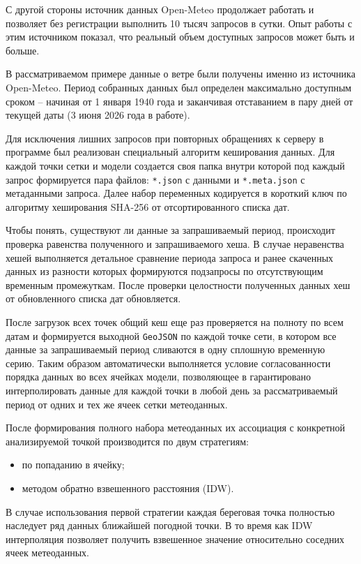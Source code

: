 С другой стороны источник данных Open-Meteo продолжает работать и позволяет без регистрации выполнить 10 тысяч запросов в сутки.
Опыт работы с этим источником показал, что реальный объем доступных запросов может быть и больше.

В рассматриваемом примере данные о ветре были получены именно из источника Open-Meteo.
Период собранных данных был определен максимально доступным сроком -- начиная от 1 января 1940 года и заканчивая отставанием в пару дней от текущей даты (3 июня 2026 года в работе).

Для исключения лишних запросов при повторных обращениях к серверу в программе был реализован специальный алгоритм кеширования данных.
Для каждой точки сетки и модели создается своя папка внутри которой под каждый запрос формируется пара файлов: \texttt{*.json} с данными и \texttt{*.meta.json} с метаданными запроса. 
Далее набор переменных кодируется в короткий ключ по алгоритму хеширования SHA-256 от отсортированного списка дат.

Чтобы понять, существуют ли данные за запрашиваемый период, происходит проверка равенства полученного и запрашиваемого хеша.
В случае неравенства хешей выполняется детальное сравнение периода запроса и ранее скаченных данных из разности которых формируются подзапросы по отсутствующим временным промежуткам.
После проверки целостности полученных данных хеш от обновленного списка дат обновляется. 

После загрузок всех точек общий кеш еще раз проверяется на полноту по всем датам и формируется выходной \texttt{GeoJSON} по каждой точке сети, в котором все данные за запрашиваемый период сливаются в одну сплошную временную серию.
Таким образом автоматически выполняется условие согласованности порядка данных во всех ячейках модели, позволяющее в гарантировано интерполировать данные для каждой точки в любой день за рассматриваемый период от одних и тех же ячеек сетки метеоданных.

После формирования полного набора метеоданных их ассоциация с конкретной анализируемой точкой производится по двум стратегиям:
\begin{itemize}
    \item по попаданию в ячейку;
    \item методом обратно взвешенного расстояния (IDW).
\end{itemize}

В случае использования первой стратегии каждая береговая точка полностью наследует ряд данных ближайшей погодной точки.
В то время как IDW интерполяция позволяет получить взвешенное значение относительно соседних ячеек метеоданных.

